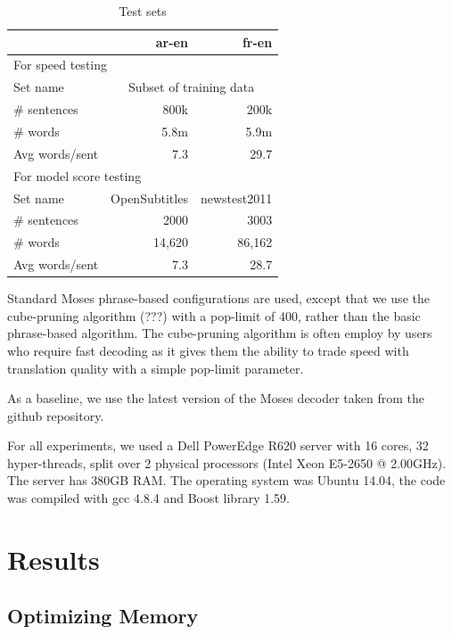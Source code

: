 \documentclass[11pt]{article}
\begin{document}
\begin{table}[h]
\begin{center}
\small
\begin{tabular}{|l|r|r|} \hline
		& ar-en		& fr-en \\ \hline
\multicolumn{3}{|l|}{For speed testing} \\ \hline
Set name	& \multicolumn{2}{|c|}{Subset of training data} \\
\# sentences  	& 800k 		& 200k \\
\# words 	& 5.8m 		& 5.9m \\ 
Avg words/sent	& 7.3		& 29.7 \\ \hline
\multicolumn{3}{|l|}{For model score testing} \\ \hline
Set name	& OpenSubtitles	& newstest2011 \\
\# sentences  	& 2000 		& 3003 \\
\# words 	& 14,620 	& 86,162 \\ 
Avg words/sent	& 7.3		& 28.7 \\ \hline
\end{tabular}
\end{center}
\caption{Test sets}
\label{tab:test-sets}
\end{table}

Standard Moses phrase-based configurations are used, except that we use the cube-pruning algorithm (???) with a pop-limit of 400, rather than the basic phrase-based algorithm. The cube-pruning algorithm is often employ by users who require fast decoding as it gives them the ability to trade speed with translation quality with a simple pop-limit parameter.

As a baseline, we use the latest version of the Moses decoder taken from the github repository.

For all experiments, we used a Dell PowerEdge R620 server with 16 cores, 32 hyper-threads, split over 2 physical processors (Intel Xeon E5-2650 @ 2.00GHz). The server has 380GB RAM. The operating system was Ubuntu 14.04, the code was compiled with gcc 4.8.4 and Boost library 1.59.

\section{Results}

\subsection{Optimizing Memory}
\end{document}
